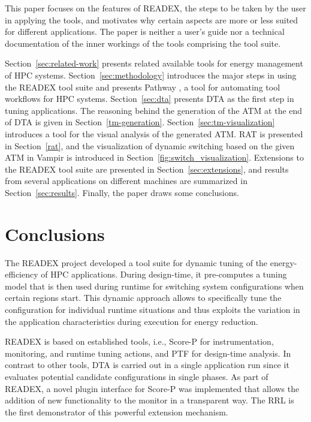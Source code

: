 \documentclass[runningheads]{llncs}
\begin{document}
This paper focuses on the features of READEX, the steps to be taken by the user in applying the tools, and motivates why certain aspects are more or less suited for different applications. The paper is neither a user's guide nor a technical documentation of the inner workings of the tools comprising the tool suite. 

Section~\ref{sec:related-work} presents related available tools for energy management of HPC systems. Section~\ref{sec:methodology} introduces the major steps in using the READEX tool suite and presents Pathway \cite{Pathway:Petkov13}, a tool for automating tool workflows for HPC systems. Section~\ref{sec:dta} presents DTA as the first step in tuning applications. The reasoning behind the generation of the ATM at the end of DTA is given in Section~\ref{tm-generation}. Section~\ref{sec:tm-visualization} introduces a tool for the visual analysis of the generated ATM. RAT is presented in Section~\ref{rat}, and the visualization of dynamic switching based on the given ATM in Vampir is introduced in Section~\ref{fig:switch_visualization}. Extensions to the READEX tool suite are presented in Section~\ref{sec:extensions}, and results from several applications on different machines are summarized in Section~\ref{sec:results}. Finally, the paper draws some conclusions. 


















\section{Conclusions} \label{sec:conclusions}

The READEX project developed a tool suite for dynamic tuning of the energy-efficiency of HPC applications. During design-time, it pre-computes a tuning model that is then used during runtime for switching system configurations when certain regions start. This dynamic approach allows to specifically tune the configuration for individual runtime situations and thus exploits the variation in the application characteristics during execution for energy reduction. 

READEX is based on established tools, i.e., Score-P for instrumentation, monitoring, and runtime tuning actions, and PTF for design-time analysis. In contrast to other tools, DTA is carried out in a single application run since it evaluates potential candidate configurations in single phases. As part of READEX, a novel plugin interface for Score-P was implemented that allows the addition of new functionality to the monitor in a transparent way. The RRL is the first demonstrator of this powerful extension mechanism.
\end{document}
